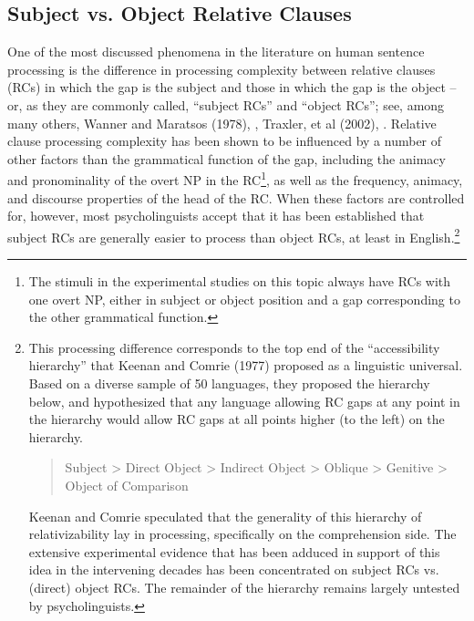 \documentclass[a4paper]{article}
\begin{document}
\subsection{Subject vs. Object Relative Clauses}

One of the most discussed phenomena in the literature on human sentence processing is the difference in processing complexity between relative clauses (RCs) in which the gap is the subject and those in which the gap is the object -- or, as they are commonly called, ``subject RCs'' and ``object RCs''; see, among many others, Wanner and Maratsos (1978), \citet{Gibson98a}, Traxler, et al (2002), \citet{GennariMacDonald2008}.  Relative clause processing complexity has been shown to be influenced by a number of other factors than the grammatical function of the gap, including the animacy and pronominality of the overt NP in the RC\footnote{The stimuli in the experimental studies on this topic always have RCs with one overt NP, either in subject or object position and a gap corresponding to the other grammatical function.}, as well as the frequency, animacy, and discourse properties of the head of the RC.  When these factors are controlled for, however, most psycholinguists accept that it has been established that subject RCs are generally easier to process than object RCs, at least in English.\footnote{This processing difference corresponds to the top end of the ``accessibility hierarchy'' that Keenan and Comrie (1977) proposed as a linguistic universal. Based on a diverse sample of 50 languages, they proposed the hierarchy below, and hypothesized that any language allowing RC gaps at any point in the hierarchy would allow RC gaps at all points higher (to the left) on the hierarchy.
\begin{quote}

Subject 
> 
Direct Object 
> 
Indirect Object 
> 
Oblique 
> 
Genitive
> 
Object of Comparison
\end{quote}
Keenan and Comrie speculated that the generality of this hierarchy of relativizability lay in processing, specifically on the comprehension side.  The extensive experimental evidence that has been adduced in support of this idea in the intervening decades has been concentrated on subject RCs vs. (direct) object RCs.  The remainder of the hierarchy remains largely untested by psycholinguists.}
\end{document}
